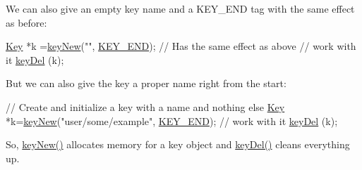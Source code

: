 We can also give an empty key name and a K\+E\+Y\+\_\+\+E\+N\+D tag with the same effect as before\+:


\begin{DoxyCodeInclude}
\hyperlink{classkdb_1_1Key_a5679f5cae63caddd64a60388b9cc77fa}{Key} *k =\hyperlink{group__key_gad23c65b44bf48d773759e1f9a4d43b89}{keyNew}(\textcolor{stringliteral}{""}, \hyperlink{group__key_gga91fb3178848bd682000958089abbaf40aa8adb6fcb92dec58fb19410eacfdd403}{KEY\_END}); \textcolor{comment}{// Has the same effect as above}
\textcolor{comment}{// work with it}
\hyperlink{group__key_ga3df95bbc2494e3e6703ece5639be5bb1}{keyDel} (k);
\end{DoxyCodeInclude}
 But we can also give the key a proper name right from the start\+:


\begin{DoxyCodeInclude}
\textcolor{comment}{// Create and initialize a key with a name and nothing else}
\hyperlink{classkdb_1_1Key_a5679f5cae63caddd64a60388b9cc77fa}{Key} *k=\hyperlink{group__key_gad23c65b44bf48d773759e1f9a4d43b89}{keyNew}(\textcolor{stringliteral}{"user/some/example"}, \hyperlink{group__key_gga91fb3178848bd682000958089abbaf40aa8adb6fcb92dec58fb19410eacfdd403}{KEY\_END});
\textcolor{comment}{// work with it}
\hyperlink{group__key_ga3df95bbc2494e3e6703ece5639be5bb1}{keyDel} (k);
\end{DoxyCodeInclude}
 So, \hyperlink{group__key_gad23c65b44bf48d773759e1f9a4d43b89}{key\+New()} allocates memory for a key object and \hyperlink{group__key_ga3df95bbc2494e3e6703ece5639be5bb1}{key\+Del()} cleans everything up.

